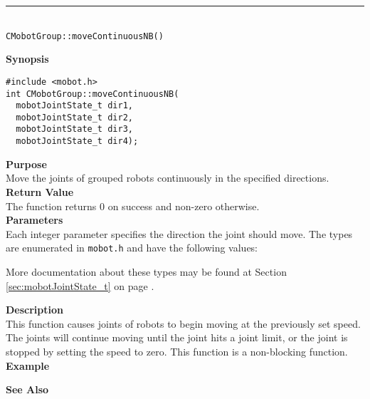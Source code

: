 \noindent
\vspace{5pt}
\rule{4.5in}{0.015in}\\
\noindent
{\LARGE \texttt{CMobotGroup::moveContinuousNB()}}\\
{}

\noindent
{\bf Synopsis}
\vspace{-8pt}
\begin{verbatim}
#include <mobot.h>
int CMobotGroup::moveContinuousNB(
  mobotJointState_t dir1, 
  mobotJointState_t dir2, 
  mobotJointState_t dir3, 
  mobotJointState_t dir4);
\end{verbatim}

\noindent
{\bf Purpose}\\
Move the joints of grouped robots continuously in the specified directions.\\

\noindent
{\bf Return Value}\\
The function returns 0 on success and non-zero otherwise.\\

\noindent
{\bf Parameters}\\
Each integer parameter specifies the direction the joint should move. The types
are enumerated in \texttt{mobot.h} and have the following values:

More documentation about these types may be found at Section
\ref{sec:mobotJointState_t} on page
\pageref{sec:mobotJointState_t}.

\noindent
{\bf Description}\\
This function causes joints of robots to begin moving at the previously set
speed. The joints will continue moving until the joint hits a joint limit, or
the joint is stopped by setting the speed to zero. This function is a non-blocking
function.\\

\noindent
{\bf Example}\\
\noindent

\noindent
{\bf See Also}\\

